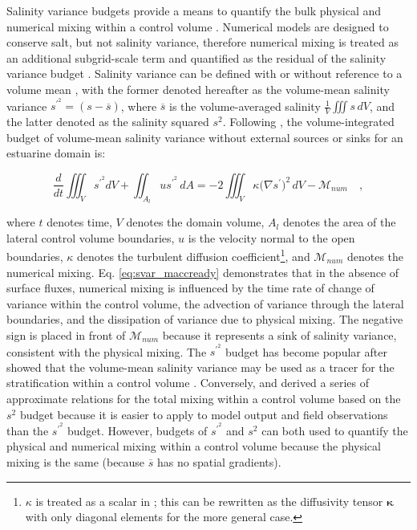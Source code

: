 \documentclass[draft]{agujournal2019}
\begin{document}
Salinity variance budgets provide a means to quantify the bulk physical and numerical mixing within a control volume \cite{Li_2018, Lorenz_2021, Qu_2022_box}. Numerical models are designed to conserve salt, but not salinity variance, therefore numerical mixing is treated as an additional subgrid-scale term and quantified as the residual of the salinity variance budget \cite{MacCready_2018}. Salinity variance can be defined with or without reference to a volume mean \cite{Burchard_2008, Qu_2022_box}, with the former denoted hereafter as the volume-mean salinity variance $s^{\prime^2} = (s-\overline{s})$, where $\overline{s}$ is the volume-averaged salinity $\frac{1}{V} \iiint s \, dV$, and the latter denoted as the salinity squared $s^2$. Following , the volume-integrated budget of volume-mean salinity variance without external sources or sinks for an estuarine domain is:
\begin{linenomath*}
\begin{equation} \label{eq:svar_maccready}
    \frac{d}{dt} \iiint_V s^{\prime^2} dV + \iint_{A_l} u s^{\prime^2} \, dA = -2 \iiint_V \kappa \big(\nabla s^{\prime} \big)^2 \, dV - \mathcal{M}_{num} \quad ,
\end{equation}
\end{linenomath*}
where $t$ denotes time, $V$ denotes the domain volume, $A_l$ denotes the area of the lateral control volume boundaries, $u$ is the velocity normal to the open boundaries, $\kappa$ denotes the turbulent diffusion coefficient\footnote{$\kappa$ is treated as a scalar in ; this can be rewritten as the diffusivity tensor $\boldsymbol{\kappa}$ with only diagonal elements for the more general case.}, and $\mathcal{M}_{num}$ denotes the numerical mixing. Eq. \ref{eq:svar_maccready} demonstrates that in the absence of surface fluxes, numerical mixing is influenced by the time rate of change of variance within the control volume, the advection of variance through the lateral boundaries, and the dissipation of variance due to physical mixing. The negative sign is placed in front of $\mathcal{M}_{num}$ because it represents a sink of salinity variance, consistent with the physical mixing. The $s^{\prime^2}$ budget has become popular after  showed that the volume-mean salinity variance may be used as a tracer for the stratification within a control volume \cite{Broatch_2022, Li_2021, Wang_2018}. Conversely,  and  derived a series of approximate relations for the total mixing within a control volume based on the $s^2$ budget because it is easier to apply to model output and field observations than the $s^{\prime^2}$ budget. However, budgets of $s^{\prime^2}$ and $s^2$ can both used to quantify the physical and numerical mixing within a control volume because the physical mixing is the same (because $\overline{s}$ has no spatial gradients). 
\end{document}
